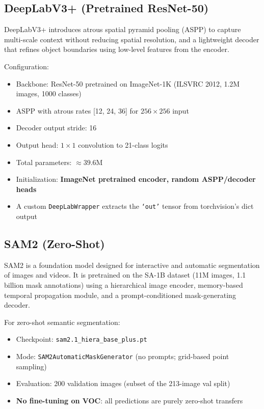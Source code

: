 \documentclass[11pt,a4paper]{article}
\begin{document}
\subsection{DeepLabV3+ (Pretrained ResNet-50)}

DeepLabV3+ introduces atrous spatial pyramid pooling (ASPP) to capture multi-scale context without reducing spatial resolution, and a lightweight decoder that refines object boundaries using low-level features from the encoder.

Configuration:
\begin{itemize}
  \item Backbone: ResNet-50 pretrained on ImageNet-1K (ILSVRC 2012, 1.2M images, 1000 classes)
  \item ASPP with atrous rates [12, 24, 36] for $256\times256$ input
  \item Decoder output stride: 16
  \item Output head: $1 \times 1$ convolution to 21-class logits
  \item Total parameters: $\approx 39.6$M
  \item Initialization: \textbf{ImageNet pretrained encoder, random ASPP/decoder heads}
  \item A custom \texttt{DeepLabWrapper} extracts the \texttt{`out'} tensor from torchvision's dict output
\end{itemize}

\subsection{SAM2 (Zero-Shot)}

SAM2 is a foundation model designed for interactive and automatic segmentation of images and videos. It is pretrained on the SA-1B dataset (11M images, 1.1 billion mask annotations) using a hierarchical image encoder, memory-based temporal propagation module, and a prompt-conditioned mask-generating decoder.

For zero-shot semantic segmentation:
\begin{itemize}
  \item Checkpoint: \texttt{sam2.1\_hiera\_base\_plus.pt}
  \item Mode: \texttt{SAM2AutomaticMaskGenerator} (no prompts; grid-based point sampling)
  \item Evaluation: 200 validation images (subset of the 213-image val split)
  \item \textbf{No fine-tuning on VOC}: all predictions are purely zero-shot transfers
\end{itemize}
\end{document}

